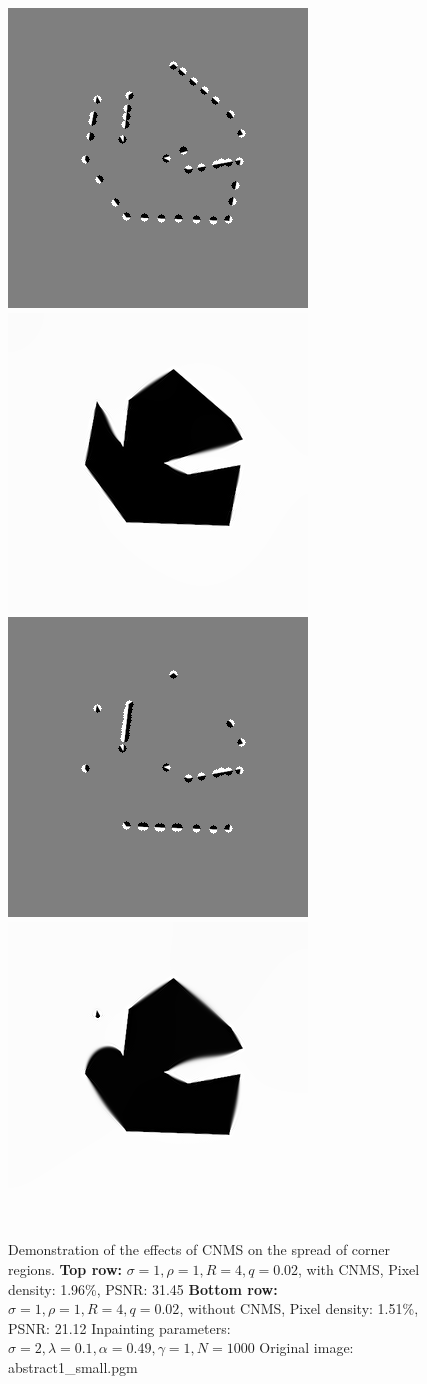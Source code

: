 \begin{figure}[h]
    \centering
    \includegraphics[width=0.4\linewidth]{../Images/abstract/abstract1_small-mask.png}\hspace{0.2cm}
    \includegraphics[width=0.4\linewidth]{../Images/abstract/abstract1_small-inpaint.png}\\
    \vspace*{0.2cm}
    \includegraphics[width=0.4\linewidth]{../Images/abstract/abstract1_small-mask_no_cnms.png}\hspace{0.2cm}
    \includegraphics[width=0.4\linewidth]{../Images/abstract/abstract1_small-inpaint_no_cnms.png}\\
    \caption{Demonstration of the effects of CNMS on the spread of corner regions.
\textbf{Top row:} $\sigma=1,\rho=1,R=4,q=0.02$, with CNMS, Pixel density: 1.96\%, PSNR\@:
31.45
\textbf{Bottom row:} $\sigma=1,\rho=1,R=4,q=0.02$, without CNMS, Pixel density:
1.51\%, PSNR\@: 21.12
Inpainting parameters: $\sigma=2,\lambda=0.1,\alpha=0.49,\gamma=1,N=1000$
Original image: abstract1\_small.pgm }\label{fig:AbstractCNMSExamples}
\end{figure}
